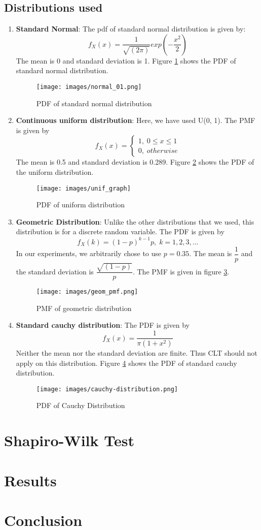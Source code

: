 \documentclass{article}
\begin{document}
\subsection{Distributions used}
\begin{enumerate}
    \item \textbf{Standard Normal}: The pdf of standard normal distribution is given by:
    $$f_X(x) = \dfrac{1}{\sqrt{(2\pi)}}exp(-\dfrac{x^2}{2})$$
    The mean is 0 and standard deviation is 1. Figure \ref{normal_pdf} shows the PDF of standard normal distribution.
    \begin{figure}[H]
        \centering
        \texttt{[image: images/normal\_01.png]}
        \caption{PDF of standard normal distribution}
        \label{normal_pdf}
    \end{figure}
    \item \textbf{Continuous uniform distribution}: Here, we have used U(0, 1). The PMF is given by $$f_X(x) = \begin{cases}1,\; 0 \le x \le 1 \\ 0,\; otherwise\end{cases}$$ 
    The mean is 0.5 and standard deviation is 0.289. Figure \ref{uni_pdf} shows the PDF of the uniform distribution.
    \begin{figure}[H]
        \centering
        \texttt{[image: images/unif\_graph]}
        \caption{PDF of uniform distribution}
        \label{uni_pdf}
    \end{figure}
    \item \textbf{Geometric Distribution}: Unlike the other distributions that we used, this distribution is for a discrete random variable. The PDF is given by
    $$f_X(k) = (1-p)^{k-1}p,\; k=1,2,3,...$$
    In our experiments, we arbitrarily chose to use $p=0.35$. The mean is $\dfrac{1}{p}$ and the standard deviation is $\dfrac{\sqrt{(1-p)}}{p}$. The PMF is given in figure \ref{geom_pmf}. 
    \begin{figure}[H]
        \centering
        \texttt{[image: images/geom\_pmf.png]}
        \caption{PMF of geometric distribution}
        \label{geom_pmf}
    \end{figure}
    \item \textbf{Standard cauchy distribution}: The PDF is given by $$f_X(x) = \dfrac{1}{\pi (1+x^2)}$$ Neither the mean nor the standard deviation are finite. Thus CLT should not apply on this distribution. Figure \ref{cauchy_pdf} shows the PDF of standard cauchy distribution.
    \begin{figure}[H]
        \centering
        \texttt{[image: images/cauchy-distribution.png]}
        \caption{PDF of Cauchy Distribution}
        \label{cauchy_pdf}
    \end{figure}
\end{enumerate}
\section{Shapiro-Wilk Test}

\section{Results}
\section{Conclusion}
\end{document}
